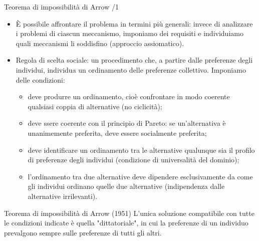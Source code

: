 \documentclass[11pt]{beamer}
\begin{document}
\begin{frame}{Teorema di impossibilità di Arrow /1}
\begin{itemize}
\item È possibile affrontare il problema in termini più generali: invece di
analizzare i problemi di ciascun meccanismo, imponiamo dei requisiti e
individuiamo quali meccanismi li soddisfino (approccio assiomatico).
\item \alert{Regola di scelta sociale}: un procedimento che, a partire dalle preferenze
degli individui, individua un ordinamento delle preferenze
collettivo. Imponiamo delle condizioni:
\begin{itemize}
\item deve produrre un ordinamento, cioè confrontare in modo coerente qualsiasi
coppia di alternative (no ciclicità);
\item deve ssere coerente con il \alert{principio di Pareto}: se un'alternativa è
unanimemente preferita, deve essere socialmente preferita;
\item deve identificare un ordinamento tra le alternative qualunque sia il
profilo di preferenze degli individui (condizione di \alert{universalità} del
dominio);
\item l'ordinamento tra due alternative deve dipendere esclusivamente da come
gli individui ordinano quelle due alternative 
(\alert{indipendenza dalle alternative irrilevanti}).
\end{itemize}
\end{itemize}
\begin{block}{Teorema di impossibilità di Arrow (1951)}
L'unica soluzione compatibile con tutte le condizioni indicate è quella
"dittatoriale", in cui la preferenze di un individuo prevalgono sempre sulle
preferenze di tutti gli altri.
\end{block}
\end{frame}
\end{document}
